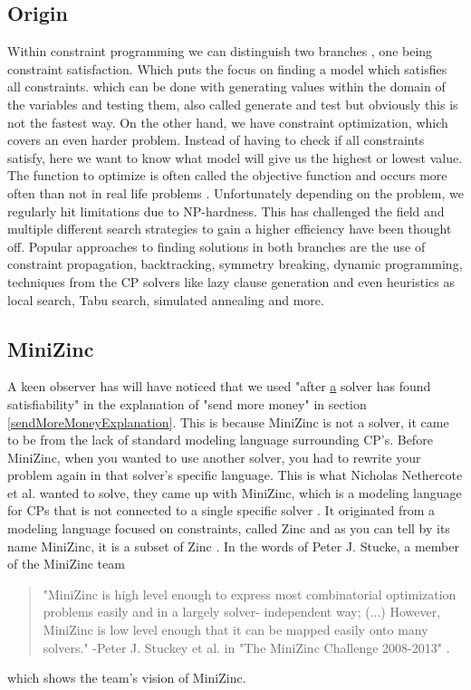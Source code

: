 \subsection{Origin}
Within constraint programming we can distinguish two branches \cite{52bartak1999constraint}, one being constraint satisfaction. Which puts the focus on finding a model which satisfies all constraints. which can be done with generating values within the domain of the variables and testing them, also called generate and test but obviously this is not the fastest way. 
On the other hand, we have constraint optimization, which covers an even harder problem. Instead of having to check if all constraints satisfy, here we want to know what model will give us the highest or lowest value. The function to optimize is often called the objective function and occurs more often than not in real life problems \cite{52bartak1999constraint}. 
Unfortunately depending on the problem, we regularly hit limitations due to NP-hardness. This has challenged the field and multiple different search strategies to gain a higher efficiency have been thought off. Popular approaches to finding solutions in both branches are the use of constraint propagation, backtracking, symmetry breaking, dynamic programming, techniques from the CP solvers like lazy clause generation and even heuristics as local search, Tabu search, simulated annealing and more. 

\subsection{MiniZinc}
A keen observer has will have noticed that we used "after \underline{a} solver has found satisfiability" in the explanation of "send more money" in section \ref{sendMoreMoneyExplanation}. 
This is because MiniZinc is not a solver, it came to be from the lack of standard modeling language surrounding CP's. Before MiniZinc, when you wanted to use another solver, you had to rewrite your problem again in that solver's specific language. This is what Nicholas Nethercote et al. wanted to solve, they came up with MiniZinc, which is a modeling language for CPs that is not connected to a single specific solver \cite{57nethercote2007minizinc}. It originated from a modeling language focused on constraints, called Zinc \cite{68incbanda2006modelling} and as you can tell by its name MiniZinc, it is a subset of Zinc \cite{57nethercote2007minizinc}.
In the words of Peter J. Stucke, a member of the MiniZinc team 

\begin{quote}
	"MiniZinc is high level enough to express most combinatorial optimization problems easily and in a largely solver-
	independent way; (...) However, MiniZinc is low level enough that it can be mapped easily onto many solvers." 
	\newline
	-Peter J. Stuckey et al. in "The MiniZinc Challenge 2008-2013" \cite{58stuckey2014minizinc}.
\end{quote} which shows the team's vision of MiniZinc.

